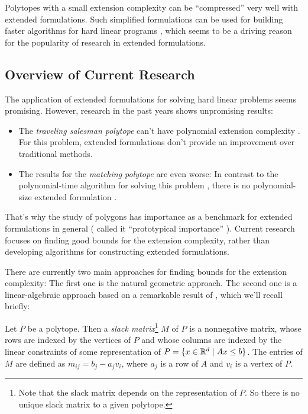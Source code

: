 Polytopes with a small extension complexity can be ``compressed'' very well with extended formulations.
Such simplified formulations can be used for building faster algorithms for hard linear programs \cite{yannakakis1991expressing}, which seems to be a driving reason for the popularity of research in extended formulations.


\subsection{Overview of Current Research}

The application of extended formulations for solving hard linear problems seems promising. However, research in the past years shows unpromising results:

\begin{itemize}
  \item The \emph{traveling salesman polytope} can't have polynomial extension complexity \cite{fiorini2015exponential}. For this problem, extended formulations don't provide an improvement over traditional methods.
  \item The results for the \emph{matching polytope} are even worse: In contrast to the polynomial-time algorithm for solving this problem \cite{ford1956maximal}, there is no polynomial-size extended formulation \cite{rothvoss2017matching}.
\end{itemize}

That's why the study of polygons has importance as a benchmark for extended formulations in general (\citeauthor{braun2015matching} called it ``prototypical importance'' \cite{braun2015matching}).
Current research focuses on finding good bounds for the extension complexity, rather than developing algorithms for constructing extended formulations.

There are currently two main approaches for finding bounds for the extension complexity: The first one is the natural geometric approach. The second one is a linear-algebraic approach based on a remarkable result of \textcite{yannakakis1991expressing}, which we'll recall briefly:

\begin{definition}
  Let $P$ be a polytope.
  Then a \emph{slack matrix}\footnote{Note that the slack matrix depends on the representation of $P$. So there is no unique slack matrix to a given polytope.} $M$ of $P$ is a nonnegative matrix, whose rows are indexed by the vertices of $P$ and whose columns are indexed by the linear constraints of some representation of $P=\{x \in \mathbb{R}^d \mid Ax \leq b\}$.
  The entries of $M$ are defined as $m_{ij} = b_j - a_j v_i$, where $a_j$ is a row of $A$ and $v_i$ is a vertex of $P$.
\end{definition}


